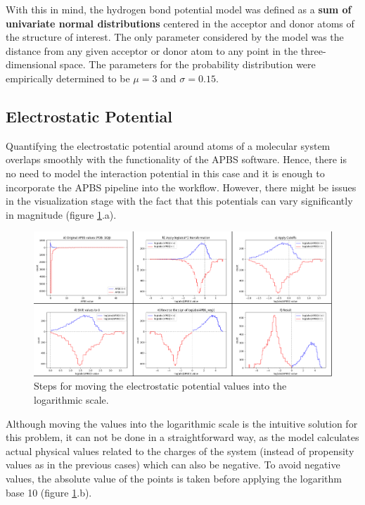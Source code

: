     With this in mind, the hydrogen bond potential model was defined as a \textbf{sum of univariate normal distributions} centered in the acceptor and donor atoms of the structure of interest. The only parameter considered by the model was the distance from any given acceptor or donor atom to any point in the three-dimensional space. The parameters for the probability distribution were empirically determined to be $\mu = 3$ and $\sigma = 0.15$.

  \subsection{Electrostatic Potential}
    Quantifying the electrostatic potential around atoms of a molecular system overlaps smoothly with the functionality of the APBS software. Hence, there is no need to model the interaction potential in this case and it is enough to incorporate the APBS pipeline into the workflow. However, there might be issues in the visualization stage with the fact that this potentials can vary significantly in magnitude (figure \ref{fig:methods/lapbs}.a).

    \begin{figure}[H]
      \centering
      \includegraphics[width=1\textwidth]{figures/methods/lapbs.png}
      \caption{\label{fig:methods/lapbs} Steps for moving the electrostatic potential values into the logarithmic scale.}
    \end{figure}

    Although moving the values into the logarithmic scale is the intuitive solution for this problem, it can not be done in a straightforward way, as the model  calculates actual physical values related to the charges of the system (instead of propensity values as in the previous cases) which can also be negative. To avoid negative values, the absolute value of the points is taken before applying the logarithm base 10 (figure \ref{fig:methods/lapbs}.b).

